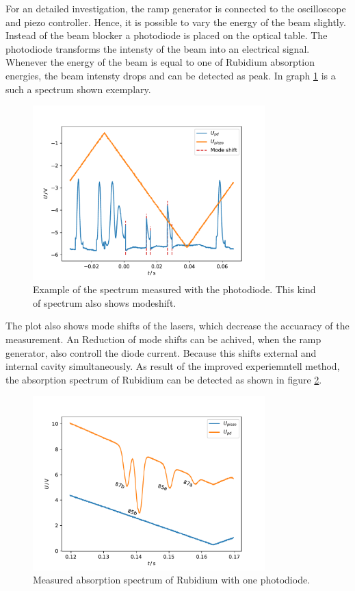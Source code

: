For an detailed investigation, the ramp generator is connected to the oscilloscope
and piezo controller. Hence, it is possible to vary the energy of the beam slightly.
Instead of the beam blocker a photodiode is placed on the
optical table. The photodiode transforms the intensty of the beam into an
electrical signal. Whenever the energy of the beam is equal to one of Rubidium
absorption energies, the beam intensty drops and can be detected as peak.
In graph \ref{fig: spectrum} is a such a spectrum shown exemplary.
\begin{figure}
  \centering
  \includegraphics[width = 0.8\textwidth]{../analysis/plots/modeshift.pdf}
  \caption{Example of the spectrum measured with the photodiode. This kind of spectrum also
          shows modeshift.}
  \label{fig: spectrum}
\end{figure}
The plot also shows mode shifts of the lasers, which decrease the accuaracy of the
measurement. An Reduction of mode shifts can be achived, when the ramp generator,
also controll the diode current. Because this shifts external and internal cavity
simultaneously. As result of the improved experiemntell method, the absorption
spectrum of Rubidium can be detected as shown in figure \ref{fig: spectrum_measured}.
\begin{figure}
  \centering
  \includegraphics[width = 0.8\textwidth]{../analysis/plots/spectrum_angled.pdf}
  \caption{Measured absorption spectrum of Rubidium with one photodiode.}
  \label{fig: spectrum_measured}
\end{figure}
